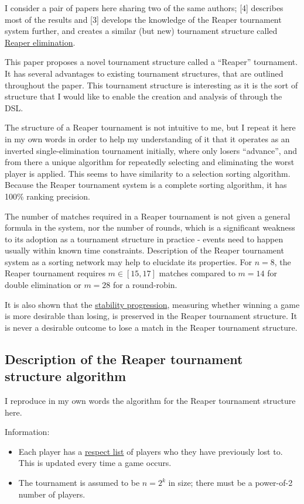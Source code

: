 \documentclass[a4,11pt,twoside,final]{article}
\makeatletter
\newcommand{\cslcitation}[2]
 {\protect\hyper@linkstart{cite}{citeproc_bib_item_#1}#2\hyper@linkend}
\makeatother
\begin{document}
I consider a pair of papers here sharing two of the same authors;
\cslcitation{4}{[4]} describes most of the results and \cslcitation{3}{[3]} develops the
knowledge of the Reaper tournament system further, and creates a similar (but
new) tournament structure called \uline{Reaper elimination}.

This paper proposes a novel tournament structure called a ``Reaper'' tournament.
It has several advantages to existing tournament structures, that are outlined
throughout the paper. This tournament structure is interesting as it is the sort
of structure that I would like to enable the creation and analysis of through
the DSL.

The structure of a Reaper tournament is not intuitive to me, but I repeat it
here in my own words in order to help my understanding of it that it operates as
an inverted single-elimination tournament initially, where only losers
``advance'', and from there a unique algorithm for repeatedly selecting and
eliminating the worst player is applied. This seems to have similarity to a
selection sorting algorithm. Because the Reaper tournament system is a complete
sorting algorithm, it has 100\% ranking precision.

The number of matches required in a Reaper tournament is not given a general
formula in the system, nor the number of rounds, which is a significant weakness
to its adoption as a tournament structure in practice - events need to happen
usually within known time constraints. Description of the Reaper tournament
system as a sorting network may help to elucidate its properties. For \(n=8\), the
Reaper tournament requires \(m\in[15,17]\) matches compared to \(m=14\) for double
elimination or \(m=28\) for a round-robin.

It is also shown that the \uline{stability progression}, measuring whether winning a
game is more desirable than losing, is preserved in the Reaper tournament
structure. It is never a desirable outcome to lose a match in the Reaper
tournament structure.

\subsection{Description of the Reaper tournament structure algorithm}
\label{sec:org5b9578b}
I reproduce in my own words the algorithm for the Reaper tournament structure
here.

Information:
\begin{itemize}
\item Each player has a \uline{respect list} of players who they have previously lost to.
This is updated every time a game occurs.
\item The tournament is assumed to be \(n=2^k\) in size; there must be a power-of-2
number of players.
\end{itemize}
\end{document}

